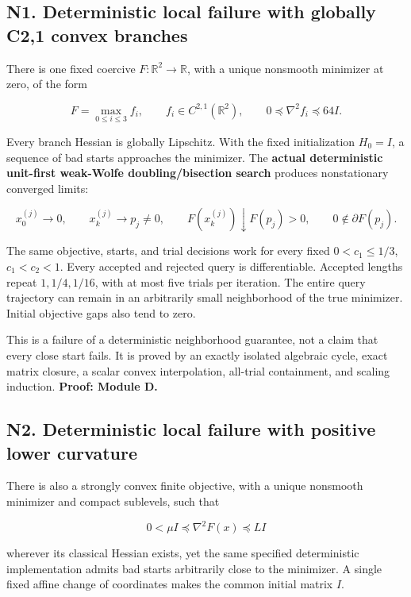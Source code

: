 \documentclass[10pt,oneside,openany]{book}
\theoremstyle{remark}\newtheorem{remark}{Remark}[chapter]
\begin{document}
\subsection{N1. Deterministic local failure with globally C2,1 convex branches}\label{n1.-deterministic-local-failure-with-globally-c21-convex-branches}

There is one fixed coercive \(F:\mathbb R^2\to\mathbb R\), with a unique nonsmooth minimizer at zero, of the form

\[
 F=\max_{0\le i\le3}f_i,\qquad f_i\in C^{2,1}(\mathbb R^2),\qquad
 0\preceq\nabla^2f_i\preceq64I.
\]

Every branch Hessian is globally Lipschitz. With the fixed initialization \(H_0=I\), a sequence of bad starts approaches the minimizer. The \textbf{actual deterministic unit-first weak-Wolfe doubling/bisection search} produces nonstationary converged limits:

\[
 x_0^{(j)}\to0,\qquad x_k^{(j)}\to p_j\ne0,\qquad
 F(x_k^{(j)})\downarrow F(p_j)>0,\qquad0\notin\partial F(p_j).
\]

The same objective, starts, and trial decisions work for every fixed \(0<c_1\le1/3\), \(c_1<c_2<1\). Every accepted and rejected query is differentiable. Accepted lengths repeat \(1,1/4,1/16\), with at most five trials per iteration. The entire query trajectory can remain in an arbitrarily small neighborhood of the true minimizer. Initial objective gaps also tend to zero.

This is a failure of a deterministic neighborhood guarantee, not a claim that every close start fails. It is proved by an exactly isolated algebraic cycle, exact matrix closure, a scalar convex interpolation, all-trial containment, and scaling induction. \textbf{Proof: Module D.}

\subsection{N2. Deterministic local failure with positive lower curvature}\label{n2.-deterministic-local-failure-with-positive-lower-curvature}

There is also a strongly convex finite objective, with a unique nonsmooth minimizer and compact sublevels, such that

\[
 0<\mu I\preceq\nabla^2F(x)\preceq LI
\]

wherever its classical Hessian exists, yet the same specified deterministic implementation admits bad starts arbitrarily close to the minimizer. A single fixed affine change of coordinates makes the common initial matrix \(I\).
\end{document}
